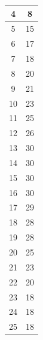 \begin{enumerate}[label=(\alph*)]
\begin{singlespace}
\begin{table}[H]
\begin{tabular}{|c|c|}
			4 & 8 \\ \hline
			
			5 & 15 \\ \hline
			
			6 & 17 \\ \hline
			
			7 & 18 \\ \hline
			
			8 & 20 \\ \hline
			
			9 & 21 \\ \hline
			
			10 & 23 \\ \hline
			
			11 & 25 \\ \hline
			
			12 & 26 \\ \hline
			
			13 & 30 \\ \hline
			
			14 & 30 \\ \hline
			
			15 & 30 \\ \hline
			
			16 & 30 \\ \hline
			
			17 & 29 \\ \hline
			
			18 & 28 \\ \hline
			
			19 & 28 \\ \hline
			
			20 & 25 \\ \hline
			
			21 & 23 \\ \hline
			
			22 & 20 \\ \hline
			
			23 & 18 \\ \hline
			
			24 & 18 \\ \hline
			
			25 & 18 \\ \hline
				
				
			\end{tabular}
		\end{table}
	\end{singlespace}
\end{enumerate}








